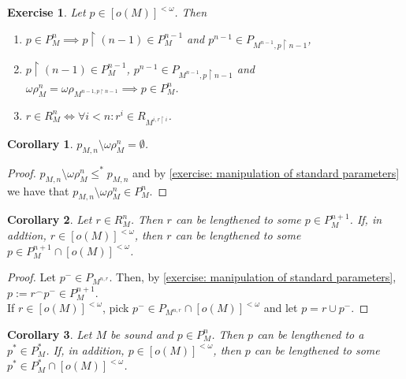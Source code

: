 \documentclass[12pt,a4paper]{article}
\theoremstyle{nicestyle}
\newtheorem{exercise}{Exercise}[subsection]
\newtheorem{corollary}{Corollary}[subsection]
\begin{document}
  \begin{exercise} \label{exercise: manipulation of standard parameters}
    Let $p \in [o(M)]^{<\omega}$. Then
    \begin{enumerate}
    \item
      $p \in P^{n}_{M} \implies p \restriction (n-1) \in P^{n-1}_{M}$
      and $p^{n-1} \in P_{M^{n-1}, p \restriction n-1}$,
    \item $p \restriction (n-1) \in P^{n-1}_{M}$,
      $p^{n-1} \in P_{M^{n-1}, p \restriction n-1}$ and
      $\omega\rho^{n}_{M} = \omega\rho_{M^{n-1, p \restriction n -1}}
      \implies p \in P^{n}_{M}$.
    \item
      $r \in R^{n}_{M} \iff \forall i < n \colon r^{i} \in R_{M^{i, r
          \restriction i}}$.
    \end{enumerate}

  \end{exercise}

  \begin{corollary}
    $p_{M,n} \setminus \omega\rho^{n}_{M} = \emptyset$.
  \end{corollary}

  \begin{proof}
    $p_{M,n} \setminus \omega\rho^{n}_{M} \le^{*} p_{M,n}$ and by
    \autoref{exercise: manipulation of standard parameters} we have
    that $p_{M,n} \setminus \omega\rho^{n}_{M} \in P^{n}_{M}$.
  \end{proof}

  \begin{corollary} \label{corollary: lengthening standard parameters}
    Let $r \in R^{n}_{M}$. Then $r$ can be lengthened to some
    $p \in P^{n+1}_{M}$. If, in addtion, $r \in [o(M)]^{< \omega}$,
    then $r$ can be lengthened to some
    $p \in P^{n+1}_{M} \cap [o(M)]^{<\omega}$.
  \end{corollary}

  \begin{proof}
    Let $p^{-} \in P_{M^{n, r}}$. Then, by \autoref{exercise:
      manipulation of standard parameters},
    $p := r ^{\frown} p^{-} \in P^{n+1}_{M}$. \\
    If $r \in [o(M)]^{< \omega}$, pick
    $p^{-} \in P_{M^{n, r}} \cap [o(M)]^{< \omega}$ and let
    $p = r \cup p^{-}$.
  \end{proof}

  \begin{corollary}
    Let $M$ be sound and $p \in P^{n}_{M}$. Then $p$ can be lengthened
    to a $p^{*} \in P^{*}_{M}$. If, in addition,
    $p \in [o(M)]^{<\omega}$, then $p$ can be lengthened to some
    $p^{*} \in P^{*}_{M} \cap [o(M)]^{<\omega}$.
  \end{corollary}
\end{document}
